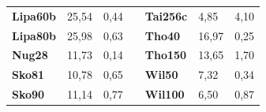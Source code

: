 \documentclass[a4paper, 12pt]{article}
\begin{document}
\begin{table}[H]
\begin{tabular}{|l|l|l|l|l|l|l|}
\textbf{Lipa60b}                    & 25,54                              & 0,44                                 &                                & \textbf{Tai256c}                   & 4,85                               & 4,10                                 \\ \cline{1-3} \cline{5-7} 
\textbf{Lipa80b}                    & 25,98                              & 0,63                                 &                                & \textbf{Tho40}                     & 16,97                              & 0,25                                 \\ \cline{1-3} \cline{5-7} 
\textbf{Nug28}                      & 11,73                              & 0,14                                 &                                & \textbf{Tho150}                    & 13,65                              & 1,70                                 \\ \cline{1-3} \cline{5-7} 
\textbf{Sko81}                      & 10,78                              & 0,65                                 &                                & \textbf{Wil50}                     & 7,32                               & 0,34                                 \\ \cline{1-3} \cline{5-7} 
\textbf{Sko90}                      & 11,14                              & 0,77                                 &                                & \textbf{Wil100}                    & 6,50                               & 0,87                                 \\ \cline{1-3} \cline{5-7} 
\end{tabular}
\end{table}
      
      
      \newpage
\end{document}
